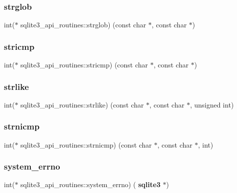 \subsubsection{strglob}
{\footnotesize\ttfamily int($\ast$ sqlite3\+\_\+api\+\_\+routines\+::strglob) (const char $\ast$, const char $\ast$)}

\mbox{\label{structsqlite3__api__routines_aa6c2af28787384ae1f266ba2d7d97972}} 
\subsubsection{stricmp}
{\footnotesize\ttfamily int($\ast$ sqlite3\+\_\+api\+\_\+routines\+::stricmp) (const char $\ast$, const char $\ast$)}

\mbox{\label{structsqlite3__api__routines_aeb83edd8809c64405e7a4546721a6d07}} 
\subsubsection{strlike}
{\footnotesize\ttfamily int($\ast$ sqlite3\+\_\+api\+\_\+routines\+::strlike) (const char $\ast$, const char $\ast$, unsigned int)}

\mbox{\label{structsqlite3__api__routines_afae159e66af1ef44594688fc0c5776d6}} 
\subsubsection{strnicmp}
{\footnotesize\ttfamily int($\ast$ sqlite3\+\_\+api\+\_\+routines\+::strnicmp) (const char $\ast$, const char $\ast$, int)}

\mbox{\label{structsqlite3__api__routines_a47c5c8b23150912e014dd155cf8f4ddd}} 
\subsubsection{system\_errno}
{\footnotesize\ttfamily int($\ast$ sqlite3\+\_\+api\+\_\+routines\+::system\+\_\+errno) (\textbf{ sqlite3} $\ast$)}

